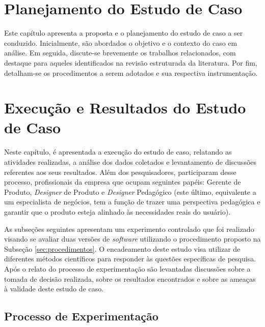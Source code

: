 \chapter{Planejamento do Estudo de Caso}
\label{ch:proposta}

Este capítulo apresenta a proposta e o planejamento do estudo de caso a ser conduzido. Inicialmente, são abordados o objetivo e o contexto do caso em análise. Em seguida, discute-se brevemente os trabalhos relacionados, com destaque para aqueles identificados na revisão estruturada da literatura. Por fim, detalham-se os procedimentos a serem adotados e sua respectiva instrumentação.











\chapter{Execução e Resultados do Estudo de Caso}
\label{subsec:execucao}

Neste capítulo, é apresentada a execução do estudo de caso, relatando as atividades realizadas, a análise dos dados coletados e levantamento de discussões referentes aos seus resultados. Além dos pesquisadores, participaram desse processo, profissionais da empresa que ocupam  seguintes papéis: Gerente de Produto, \textit{Designer} de Produto e \textit{Designer} Pedagógico (este último, equivalente a um especialista de negócios, tem a função de trazer uma perspectiva pedagógica e garantir que o produto esteja alinhado às necessidades reais do usuário).

As subseções seguintes apresentam um experimento controlado que foi realizado visando se avaliar duas versões de \textit{software} utilizando o procedimento proposto na Subseção \ref{sec:procedimentos}. O encadeamento deste estudo visa utilizar de diferentes métodos científicos para responder às questões específicas de pesquisa. Após o relato do processo de experimentação são levantadas discussões sobre a tomada de decisão realizada, sobre os resultados encontrados e sobre as ameaças à validade deste estudo de caso.

\section{Processo de Experimentação}

